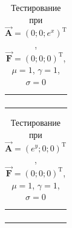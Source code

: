 \begin{table}
	\caption{Тестирование при $\overrightarrow{\textbf{A}} = (0; 0; e^x)^{\text{T}}$, $\overrightarrow{\textbf{F}} = (0; 0; 0)^{\text{T}}$, $\mu = 1$, $\gamma = 1$, $\sigma = 0$}
	\centering
	\small
	\begin{tabularx}{1.0\textwidth}{| >{\raggedright\arraybackslash}X | >{\raggedright\arraybackslash}X | >{\raggedright\arraybackslash}X |>{\raggedright\arraybackslash}X |}
		\hline
		\centering{Шаг по оси $x$} & \centering{Средняя погрешность} & \centering{$\text{log}_2\left(\frac{\sigma_{i-1}}{\sigma_i}\right)$} \tabularnewline \hline		
		
		\centering{$h$} & \centering{4.1223218E-001} & \centering{-} \tabularnewline \hline
		
		\centering{${}^h/_2$} & \centering{6.9015889E-002} & \centering{2.57845668} \tabularnewline \hline
		
		\centering{${}^h/_4$} & \centering{1.4360912E-002} & \centering{2.26478117} \tabularnewline \hline
		
		\centering{${}^h/_8$} & \centering{3.28952607E-003} & \centering{2.1261957} \tabularnewline \hline
		
	\end{tabularx}
	\label{tab:test12}
\end{table}

\begin{table}
	\caption{Тестирование при $\overrightarrow{\textbf{A}} = (e^y; 0; 0)^{\text{T}}$, $\overrightarrow{\textbf{F}} = (0; 0; 0)^{\text{T}}$, $\mu = 1$, $\gamma = 1$, $\sigma = 0$}
	\centering
	\small
	\begin{tabularx}{1.0\textwidth}{| >{\raggedright\arraybackslash}X | >{\raggedright\arraybackslash}X | >{\raggedright\arraybackslash}X |>{\raggedright\arraybackslash}X |}
		\hline
		\centering{Шаг по оси $y$} & \centering{Средняя погрешность} & \centering{$\text{log}_2\left(\frac{\sigma_{i-1}}{\sigma_i}\right)$} \tabularnewline \hline		
		
		\centering{$h$} & \centering{4.1223218E-001} & \centering{-} \tabularnewline \hline

		\centering{${}^h/_2$} & \centering{6.9015889E-002} & \centering{2.57845668} \tabularnewline \hline

		\centering{${}^h/_4$} & \centering{1.4360912E-002} & \centering{2.26478117} \tabularnewline \hline

		\centering{${}^h/_8$} & \centering{3.28952607E-003} & \centering{2.1261957} \tabularnewline \hline
		
	\end{tabularx}
	\label{tab:test13}
\end{table}

